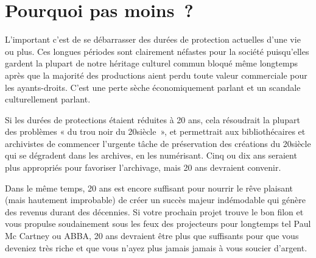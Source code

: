 \section{Pourquoi pas moins~?}

L’important c’est de se débarrasser des durées de protection actuelles d’une vie ou plus. Ces
longues périodes sont clairement néfastes pour la société puisqu’elles gardent la plupart de notre
héritage culturel commun bloqué même longtemps après que la majorité des productions aient perdu
toute valeur commerciale pour les ayants-droits. C’est une perte sèche économiquement parlant et un
scandale culturellement parlant.

Si les durées de protections étaient réduites à 20 ans, cela résoudrait la plupart des problèmes «
du trou noir du 20\ieme siècle~», et permettrait aux bibliothécaires et archivistes de commencer
l’urgente tâche de préservation des créations du 20\ieme siècle qui se dégradent dans les archives, en
les numérisant. Cinq ou dix ans seraient plus appropriés pour favoriser l’archivage, mais 20 ans
devraient convenir.

Dans le même temps, 20 ans est encore suffisant pour nourrir le rêve plaisant (mais hautement
improbable) de créer un succès majeur indémodable qui génère des revenus durant des décennies. Si
votre prochain projet trouve le bon filon et vous propulse soudainement sous les feux des
projecteurs pour longtemps tel Paul Mc Cartney ou ABBA, 20 ans devraient
être plus que suffisants pour que vous deveniez très riche et que vous n’ayez plus jamais jamais à
vous soucier d’argent.
